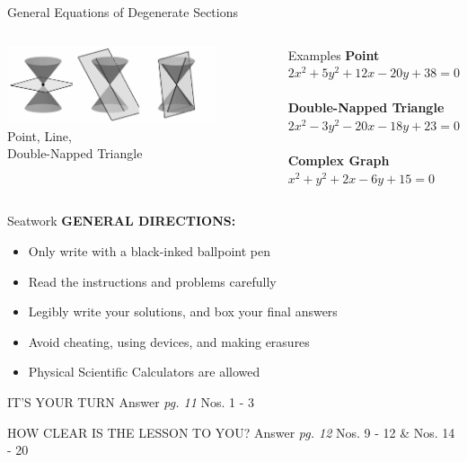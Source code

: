 \documentclass[14pt,aspectratio=169]{beamer}
\begin{document}
\begin{frame}{General Equations of Degenerate Sections}
\begin{columns}
 \centering
        \includegraphics[width=0.8\textwidth]{image11.png}\\Point, Line, \\ Double-Napped Triangle
 \begin{exampleblock}{Examples}
  \textbf{Point} \\
  $2x^2 + 5y^2 + 12x -20y + 38 =0$ \\~\\
  \textbf{Double-Napped Triangle}\\
  $2x^2-3y^2-20x-18y+23=0$\\~\\
  \textbf{Complex Graph} \\
  $x^2+y^2+2x-6y+15=0$
 \end{exampleblock}

\end{columns}

\end{frame}

\begin{frame}{Seatwork}
\textbf{GENERAL DIRECTIONS:}
\begin{itemize}
 \item Only write with a black-inked ballpoint pen
 \item Read the instructions and problems carefully
 \item Legibly write your solutions, and box your final answers
 \item Avoid cheating, using devices, and making erasures
 \item Physical Scientific Calculators are allowed
\end{itemize}

 \begin{block}{IT'S YOUR TURN}
    Answer \emph{pg. 11} Nos. 1 - 3
 \end{block}

 \begin{block}{HOW CLEAR IS THE LESSON TO YOU?}
  Answer \emph{pg. 12} Nos. 9 - 12 \& Nos. 14 - 20
 \end{block}


\end{frame}
\end{document}
